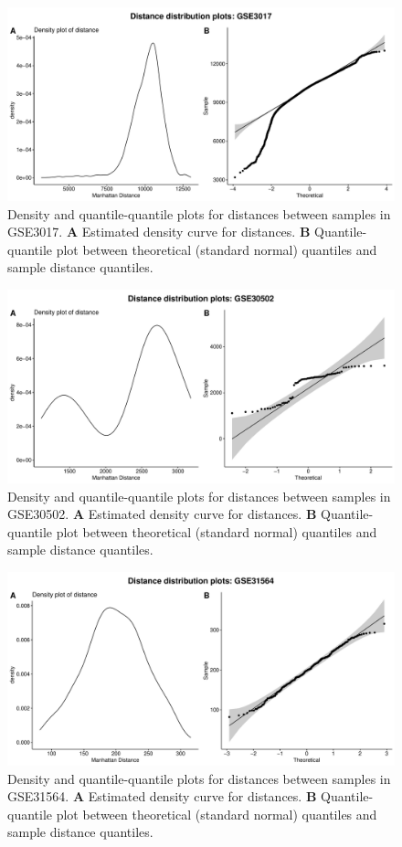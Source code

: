 \documentclass[10pt,letterpaper]{article}\usepackage[]{graphicx}\usepackage[]{color}
\begin{document}
\begin{figure}[H]
	\includegraphics[width=\textwidth]{manhattan-distance_hist_GSE3017.pdf}
	\caption{Density and quantile-quantile plots for distances between samples in GSE3017. \textbf{A} Estimated density curve for distances. \textbf{B} Quantile-quantile plot between theoretical (standard normal) quantiles and sample distance quantiles.}
\end{figure}

\begin{figure}[H]
	\includegraphics[width=\textwidth]{manhattan-distance_hist_GSE30502.pdf}
	\caption{Density and quantile-quantile plots for distances between samples in GSE30502. \textbf{A} Estimated density curve for distances. \textbf{B} Quantile-quantile plot between theoretical (standard normal) quantiles and sample distance quantiles.}
\end{figure}

\begin{figure}[H]
	\includegraphics[width=\textwidth]{manhattan-distance_hist_GSE31564.pdf}
	\caption{Density and quantile-quantile plots for distances between samples in GSE31564. \textbf{A} Estimated density curve for distances. \textbf{B} Quantile-quantile plot between theoretical (standard normal) quantiles and sample distance quantiles.}
\end{figure}
\end{document}
